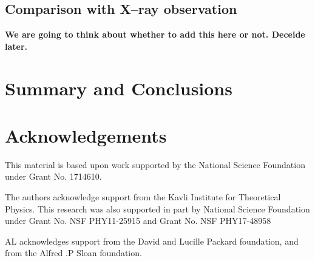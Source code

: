 \documentclass[a4paper,fleqn,usenatbib]{mnras}
\begin{document}
\subsection{Comparison with X--ray observation}
    \label{sec:xray}

\textbf{We are going to think about whether to add this here or not. Deceide later.}



\section{Summary and Conclusions}
    \label{sec:summary}
    



\section*{Acknowledgements}


  This material is based upon work supported by the National Science Foundation under 
  Grant No. 1714610. 
  
  The authors acknowledge support from the Kavli Institute for Theoretical Physics.
  This research was also supported in part by National Science Foundation under Grant 
  No. NSF PHY11-25915 and Grant No. NSF PHY17-48958
  
  AL acknowledges support from the David and Lucille Packard foundation, and from the 
  Alfred .P Sloan foundation.
\end{document}
